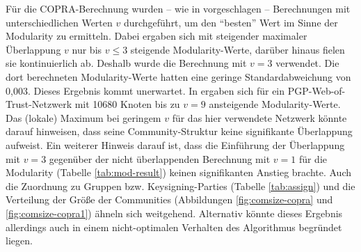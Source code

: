 Für die COPRA-Berechnung wurden -- wie in \cite{Gregory2010}
vorgeschlagen -- Berechnungen mit unterschiedlichen Werten $v$
durchgeführt, um den ``besten'' Wert im Sinne der Modularity zu
ermitteln. Dabei ergaben sich mit steigender maximaler Überlappung
$v$ nur bis $v\le 3$ steigende Modularity-Werte, darüber hinaus
fielen sie kontinuierlich ab. Deshalb wurde die Berechnung mit $v=3$
verwendet. Die dort berechneten Modularity-Werte hatten eine geringe
Standardabweichung von 0,003. Dieses Ergebnis kommt unerwartet. In
\cite{Gregory2010} ergaben sich für ein PGP-Web-of-Trust-Netzwerk
mit 10680 Knoten bis zu $v=9$ ansteigende Modularity-Werte. Das
(lokale) Maximum bei geringem $v$ für das hier verwendete Netzwerk
könnte darauf hinweisen, dass seine Community-Struktur keine
signifikante Überlappung aufweist. Ein weiterer Hinweis darauf ist,
dass die Einführung der Überlappung mit $v=3$ gegenüber der
nicht überlappenden Berechnung mit $v=1$ für die Modularity
(Tabelle \ref{tab:mod-result}) keinen signifikanten Anstieg
brachte. Auch die Zuordnung zu Gruppen bzw. Keysigning-Parties
(Tabelle \ref{tab:assign}) und die Verteilung der Größe der
Communities (Abbildungen \ref{fig:comsize-copra} und
\ref{fig:comsize-copra1}) ähneln sich weitgehend. Alternativ
könnte dieses Ergebnis allerdings auch in einem nicht-optimalen
Verhalten des Algorithmus begründet liegen.

